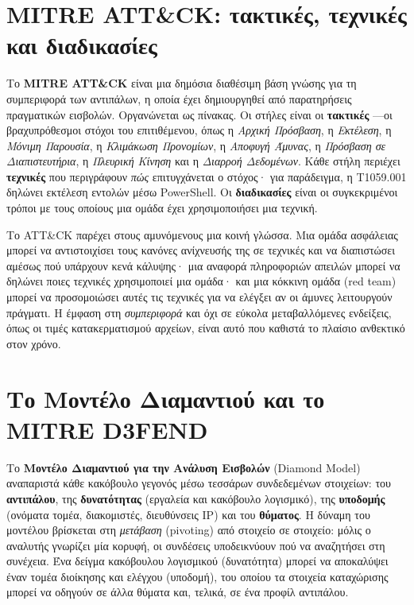 \section{MITRE ATT\&CK: τακτικές, τεχνικές και διαδικασίες}\label{sec:3.4}
Το \textbf{MITRE ATT\&CK} είναι μια δημόσια διαθέσιμη βάση γνώσης για τη συμπεριφορά των αντιπάλων, η οποία έχει δημιουργηθεί από παρατηρήσεις πραγματικών εισβολών. Οργανώνεται ως πίνακας. Οι στήλες είναι οι \textbf{τακτικές} —οι βραχυπρόθεσμοι στόχοι του επιτιθέμενου, όπως η \emph{Αρχική Πρόσβαση}, η \emph{Εκτέλεση}, η \emph{Μόνιμη Παρουσία}, η \emph{Κλιμάκωση Προνομίων}, η \emph{Αποφυγή Άμυνας}, η \emph{Πρόσβαση σε Διαπιστευτήρια}, η \emph{Πλευρική Κίνηση} και η \emph{Διαρροή Δεδομένων}. Κάθε στήλη περιέχει \textbf{τεχνικές} που περιγράφουν \emph{πώς} επιτυγχάνεται ο στόχος· για παράδειγμα, η T1059.001 δηλώνει εκτέλεση εντολών μέσω PowerShell. Οι \textbf{διαδικασίες} είναι οι συγκεκριμένοι τρόποι με τους οποίους μια ομάδα έχει χρησιμοποιήσει μια τεχνική.

Το ATT\&CK παρέχει στους αμυνόμενους μια κοινή γλώσσα. Μια ομάδα ασφάλειας μπορεί να αντιστοιχίσει τους κανόνες ανίχνευσής της σε τεχνικές και να διαπιστώσει αμέσως πού υπάρχουν κενά κάλυψης· μια αναφορά πληροφοριών απειλών μπορεί να δηλώνει ποιες τεχνικές χρησιμοποιεί μια ομάδα· και μια κόκκινη ομάδα (red team) μπορεί να προσομοιώσει αυτές τις τεχνικές για να ελέγξει αν οι άμυνες λειτουργούν πράγματι. Η έμφαση στη \emph{συμπεριφορά} και όχι σε εύκολα μεταβαλλόμενες ενδείξεις, όπως οι τιμές κατακερματισμού αρχείων, είναι αυτό που καθιστά το πλαίσιο ανθεκτικό στον χρόνο.

\section{Το Μοντέλο Διαμαντιού και το MITRE D3FEND}\label{sec:3.5}
Το \textbf{Μοντέλο Διαμαντιού για την Ανάλυση Εισβολών} (Diamond Model) αναπαριστά κάθε κακόβουλο γεγονός μέσω τεσσάρων συνδεδεμένων στοιχείων: του \textbf{αντιπάλου}, της \textbf{δυνατότητας} (εργαλεία και κακόβουλο λογισμικό), της \textbf{υποδομής} (ονόματα τομέα, διακομιστές, διευθύνσεις IP) και του \textbf{θύματος}. Η δύναμη του μοντέλου βρίσκεται στη \emph{μετάβαση} (pivoting) από στοιχείο σε στοιχείο: μόλις ο αναλυτής γνωρίζει μία κορυφή, οι συνδέσεις υποδεικνύουν πού να αναζητήσει στη συνέχεια. Ένα δείγμα κακόβουλου λογισμικού (δυνατότητα) μπορεί να αποκαλύψει έναν τομέα διοίκησης και ελέγχου (υποδομή), του οποίου τα στοιχεία καταχώρισης μπορεί να οδηγούν σε άλλα θύματα και, τελικά, σε ένα προφίλ αντιπάλου.


